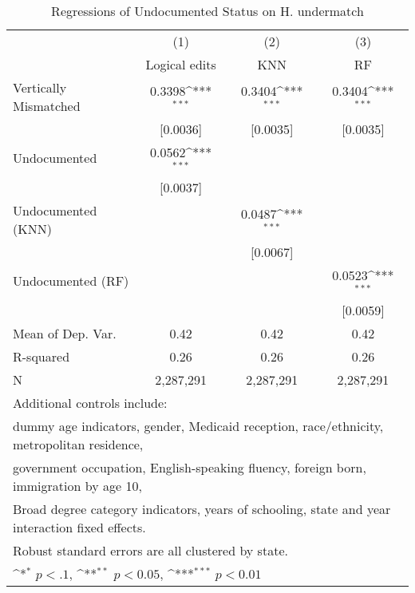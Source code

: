 \begin{table}[htbp]\centering
\def\sym#1{\ifmmode^{#1}\else\(^{#1}\)\fi}
\caption{Regressions of Undocumented Status on H. undermatch}
\begin{tabular}{l*{3}{c}}
\toprule
                    &\multicolumn{1}{c}{(1)}         &\multicolumn{1}{c}{(2)}         &\multicolumn{1}{c}{(3)}         \\
                    &Logical edits         &         KNN         &          RF         \\
\midrule
Vertically Mismatched&      0.3398\sym{***}&      0.3404\sym{***}&      0.3404\sym{***}\\
                    &    [0.0036]         &    [0.0035]         &    [0.0035]         \\
\addlinespace
Undocumented        &      0.0562\sym{***}&                     &                     \\
                    &    [0.0037]         &                     &                     \\
\addlinespace
Undocumented (KNN)  &                     &      0.0487\sym{***}&                     \\
                    &                     &    [0.0067]         &                     \\
\addlinespace
Undocumented (RF)   &                     &                     &      0.0523\sym{***}\\
                    &                     &                     &    [0.0059]         \\
\midrule
Mean of Dep. Var.   &        0.42         &        0.42         &        0.42         \\
R-squared           &        0.26         &        0.26         &        0.26         \\
N                   &   2,287,291         &   2,287,291         &   2,287,291         \\
\bottomrule
\multicolumn{4}{l}{\footnotesize Additional controls include:}\\
\multicolumn{4}{l}{\footnotesize dummy age indicators, gender, Medicaid reception, race/ethnicity, metropolitan residence,}\\
\multicolumn{4}{l}{\footnotesize government occupation, English-speaking fluency, foreign born, immigration by age 10,}\\
\multicolumn{4}{l}{\footnotesize Broad degree category indicators, years of schooling, state and year interaction fixed effects.}\\
\multicolumn{4}{l}{\footnotesize Robust standard errors are all clustered by state.}\\
\multicolumn{4}{l}{\footnotesize \sym{*} \(p<.1\), \sym{**} \(p<0.05\), \sym{***} \(p<0.01\)}\\
\end{tabular}
\end{table}
